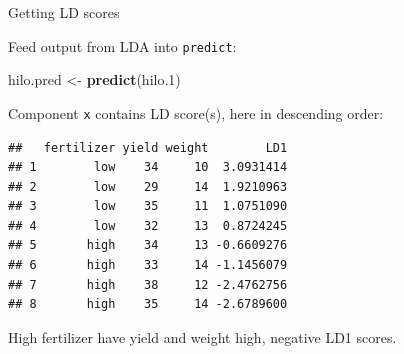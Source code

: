 \documentclass[ignorenonframetext,]{beamer}
\newenvironment{Shaded}{\begin{snugshade}}{\end{snugshade}}
\newcommand{\FloatTok}[1]{\textcolor[rgb]{0.00,0.00,0.81}{#1}}
\newcommand{\KeywordTok}[1]{\textcolor[rgb]{0.13,0.29,0.53}{\textbf{#1}}}
\newcommand{\NormalTok}[1]{#1}
\newcommand{\OperatorTok}[1]{\textcolor[rgb]{0.81,0.36,0.00}{\textbf{#1}}}
\newcommand{\StringTok}[1]{\textcolor[rgb]{0.31,0.60,0.02}{#1}}
\begin{document}
\begin{frame}[fragile]{Getting LD scores}
\protect\hypertarget{getting-ld-scores}{}

Feed output from LDA into \texttt{predict}:

\begin{Shaded}
\begin{Highlighting}[]
\NormalTok{hilo.pred <-}\StringTok{ }\KeywordTok{predict}\NormalTok{(hilo}\FloatTok{.1}\NormalTok{)}
\end{Highlighting}
\end{Shaded}

Component \texttt{x} contains LD score(s), here in descending order:

\footnotesize

\begin{Shaded}
\end{Shaded}

\begin{verbatim}
##   fertilizer yield weight        LD1
## 1        low    34     10  3.0931414
## 2        low    29     14  1.9210963
## 3        low    35     11  1.0751090
## 4        low    32     13  0.8724245
## 5       high    34     13 -0.6609276
## 6       high    33     14 -1.1456079
## 7       high    38     12 -2.4762756
## 8       high    35     14 -2.6789600
\end{verbatim}

\normalsize

High fertilizer have yield and weight high, negative LD1 scores.

\end{frame}
\end{document}
